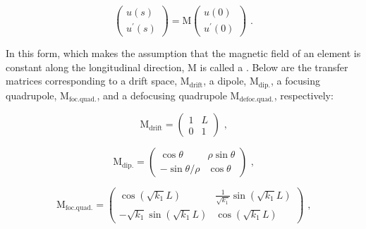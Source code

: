 \begin{equation}
    \left(
        \begin{array}{c}
            u(s) \\
            u^{\prime}(s)
        \end{array} \right) = \mathrm{M} \left( 
        \begin{array}{c}
            u(0) \\
            u^{\prime}(0)
    \end{array} \right) \text{ .}
    \label{equation:hill_solution_matrix}
\end{equation}

In this form, which makes the assumption that the magnetic field of an element is constant along the longitudinal direction, M is called a . 
Below are the transfer matrices corresponding to a drift space, \(\mathrm{M_{drift}}\), a dipole, \(\mathrm{M_{dip.}}\), a focusing quadrupole, \(\mathrm{M_{foc. quad.}}\), and a defocusing quadrupole \(\mathrm{M_{defoc. quad.}}\), respectively:

\begin{equation}
    \mathrm{M_{drift}} = \left(
        \begin{array}{ll}
            1 & L \\
            0 & 1
    \end{array} \right) \text{ ,}
    \label{equation:drift_transfer_matrix}
\end{equation}

\begin{equation}
    \mathrm{M_{dip.}} = \left(
        \begin{array}{cc}
            \cos \theta           & \rho \sin \theta \\
            - \sin \theta / \rho  & \cos \theta
    \end{array} \right) \text{ ,}
    \label{equation:dipole_transfer_matrix}
\end{equation}

\begin{equation}
    \mathrm{M_{foc. quad.}} = \left(
        \begin{array}{cc}
            \cos \left( \sqrt{k_1} L \right)             & \frac{1}{\sqrt{k_1}} \sin \left( \sqrt{k_1} L \right) \\
            -\sqrt{k_1} \sin \left( \sqrt{k_1} L \right) & \cos \left( \sqrt{k_1} L \right)
    \end{array} \right) \text{ ,}
    \label{equation:focusing_quad_transfer_matrix}
\end{equation}

